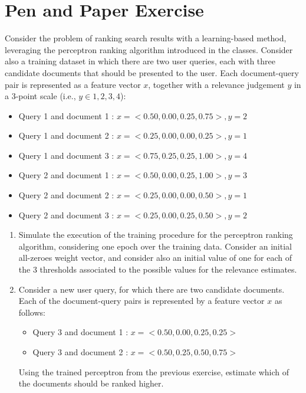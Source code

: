 \documentclass[12pt]{article}
\begin{document}
\section{Pen and Paper Exercise}

Consider the problem of ranking search results with a learning-based method, leveraging the perceptron ranking algorithm introduced in the classes. Consider also a training dataset in which there are two user queries, each with three candidate documents that should be presented to the user. Each document-query pair is represented as a feature vector $x$, together with a relevance judgement $y$ in a 3-point scale (i.e., $y \in {1,2,3,4}$):

\begin{itemize}
\item Query 1 and document 1 : $x=<0.50, 0.00, 0.25, 0.75> , y=2$
\item Query 1 and document 2 : $x=<0.25, 0.00, 0.00, 0.25> , y=1$
\item Query 1 and document 3 : $x=<0.75, 0.25, 0.25, 1.00> , y=4$

\item Query 2 and document 1 : $x=<0.50, 0.00, 0.25, 1.00> , y=3$
\item Query 2 and document 2 : $x=<0.25, 0.00, 0.00, 0.50> , y=1$
\item Query 2 and document 3 : $x=<0.25, 0.00, 0.25, 0.50> , y=2$
\end{itemize}

\begin{enumerate}
\item Simulate the execution of the training procedure for the perceptron ranking algorithm, considering one epoch over the training data. Consider an initial all-zeroes weight vector, and consider also an initial value of one for each of the 3 thresholds associated to the possible values for the relevance estimates.

\item Consider a new user query, for which there are two candidate documents. Each of the document-query pairs is represented by a feature vector $x$ as follows:

\begin{itemize}
\item Query 3 and document 1 : $x=<0.50, 0.00, 0.25, 0.25>$
\item Query 3 and document 2 : $x=<0.50, 0.25, 0.50, 0.75>$
\end{itemize}

Using the trained perceptron from the previous exercise, estimate which of the documents should be ranked higher.
\end{enumerate}
\end{document}
